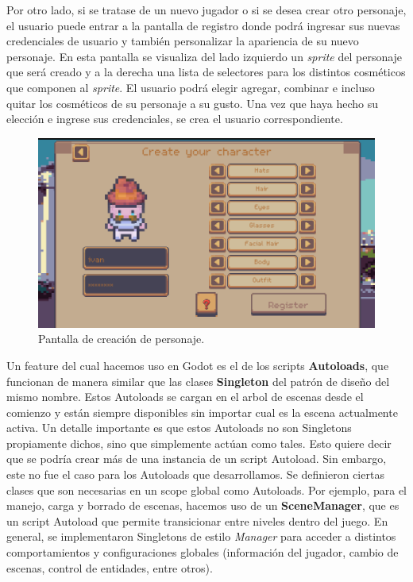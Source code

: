 Por otro lado, si se tratase de un nuevo jugador o si se desea crear otro personaje, el usuario
puede entrar a la pantalla de registro donde podrá ingresar sus nuevas
credenciales de usuario y también personalizar la apariencia de su nuevo personaje. En esta pantalla
se visualiza del lado izquierdo un \textit{sprite} del personaje que será creado y a la derecha una
lista de selectores para los distintos cosméticos que componen al \textit{sprite}. El usuario podrá elegir
agregar, combinar e incluso quitar los cosméticos de su personaje a su gusto. Una vez que haya hecho su elección
e ingrese sus credenciales, se crea el usuario correspondiente.

\begin{figure}[htbp]
    \centering
    \includegraphics[width=1.0\textwidth]{../assets/godot-register.png}
    \caption{Pantalla de creación de personaje.}
    \label{fig:godot-main-menu}
\end{figure}

Un feature del cual hacemos uso en Godot es el de los scripts \textbf{Autoloads}, que funcionan de manera
similar que las clases \textbf{Singleton} del patrón de diseño del mismo nombre.
Estos Autoloads se cargan en el arbol de escenas desde el comienzo y están siempre disponibles
sin importar cual es la escena actualmente activa. Un detalle importante es que
estos Autoloads no son Singletons propiamente dichos, sino que simplemente actúan como tales. Esto quiere
decir que se podría crear más de una instancia de un script Autoload. Sin embargo, este no fue el caso
para los Autoloads que desarrollamos.
Se definieron ciertas clases que son necesarias en un scope global como Autoloads.
Por ejemplo, para el manejo, carga y borrado de escenas, hacemos uso de un \textbf{SceneManager}, 
que es un script Autoload que permite transicionar entre niveles dentro del juego. En general, 
se implementaron Singletons de estilo \textit{Manager} para acceder a distintos comportamientos y 
configuraciones globales (información del jugador, cambio de escenas, control de entidades, entre otros).

